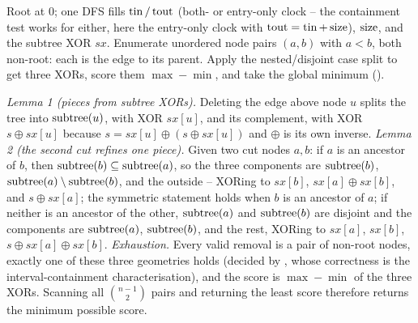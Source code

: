 Root at $0$; one DFS fills $\operatorname{tin}/\operatorname{tout}$ (both- or entry-only clock -- the containment test works
for either, here the entry-only clock with $\operatorname{tout}=\operatorname{tin}+\operatorname{size}$), $\operatorname{size}$, and the subtree XOR
$\mathit{sx}$. Enumerate unordered node pairs $(a,b)$ with $a<b$, both non-root: each is the edge
to its parent. Apply the nested/disjoint case split to get three XORs, score them
$\max-\min$, and take the global minimum ().

\begin{proofbox}
\emph{Lemma 1 (pieces from subtree XORs).} Deleting the edge above node $u$ splits the tree into
$\operatorname{subtree}(u)$, with XOR $\mathit{sx}[u]$, and its complement, with XOR $s\oplus\mathit{sx}[u]$
because $s=\mathit{sx}[u]\oplus(s\oplus\mathit{sx}[u])$ and $\oplus$ is its own inverse.
\emph{Lemma 2 (the second cut refines one piece).} Given two cut nodes $a,b$: if $a$ is an
ancestor of $b$, then $\operatorname{subtree}(b)\subseteq\operatorname{subtree}(a)$, so the three components are
$\operatorname{subtree}(b)$, $\operatorname{subtree}(a)\setminus\operatorname{subtree}(b)$, and the outside -- XORing to
$\mathit{sx}[b]$, $\mathit{sx}[a]\oplus\mathit{sx}[b]$, and $s\oplus\mathit{sx}[a]$; the symmetric
statement holds when $b$ is an ancestor of $a$; if neither is an ancestor of the other,
$\operatorname{subtree}(a)$ and $\operatorname{subtree}(b)$ are disjoint and the components are $\operatorname{subtree}(a)$,
$\operatorname{subtree}(b)$, and the rest, XORing to $\mathit{sx}[a]$, $\mathit{sx}[b]$,
$s\oplus\mathit{sx}[a]\oplus\mathit{sx}[b]$. \emph{Exhaustion.} Every valid removal is a pair of
non-root nodes, exactly one of these three geometries holds (decided by , whose
correctness is the interval-containment characterisation), and the score is
$\max-\min$ of the three XORs. Scanning all $\binom{n-1}{2}$ pairs and returning the least score
therefore returns the minimum possible score.
\end{proofbox}

